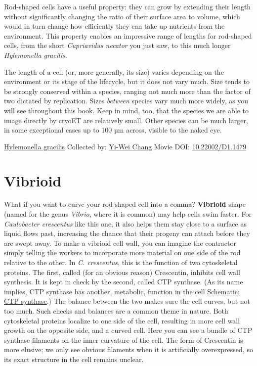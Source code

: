 \documentclass[]{tufte-book}
\begin{document}
Rod-shaped cells have a useful property: they can grow by extending their length without significantly changing the ratio of their surface area to volume, which would in turn change how efficiently they can take up nutrients from the environment. This property enables an impressive range of lengths for rod-shaped cells, from the short \emph{Cupriavidus necator} you just saw, to this much longer \emph{Hylemonella gracilis}.

The length of a cell (or, more generally, its size) varies depending on the environment or its stage of the lifecycle, but it does not vary much. Size tends to be strongly conserved within a species, ranging not much more than the factor of two dictated by replication. Sizes \emph{between} species vary much more widely, as you will see throughout this book. Keep in mind, too, that the species we are able to image directly by cryoET are relatively small. Other species can be much larger, in some exceptional cases up to 100 µm across, visible to the naked eye.



\hypertarget{htmlwidget-6fb2ea8c6df4aa12e02e}{}

\label{fig:3-3}\protect\hyperlink{tree}{Hylemonella gracilis} Collected by: \protect\hyperlink{yi-wei_chang}{Yi-Wei Chang} Movie DOI: \href{https://doi.org/10.22002/D1.1479}{10.22002/D1.1479}

\hypertarget{vibrioid}{%
\section{Vibrioid}\label{vibrioid}}

What if you want to curve your rod-shaped cell into a comma? \textbf{Vibrioid} shape (named for the genus \emph{Vibrio}, where it is common) may help cells swim faster. For \emph{Caulobacter crescentus} like this one, it also helps them stay close to a surface as liquid flows past, increasing the chance that their progeny can attach before they are swept away. To make a vibrioid cell wall, you can imagine the contractor simply telling the workers to incorporate more material on one side of the rod relative to the other. In \emph{C. crescentus}, this is the function of two cytoskeletal proteins. The first, called (for an obvious reason) Crescentin, inhibits cell wall synthesis. It is kept in check by the second, called CTP synthase. (As its name implies, CTP synthase has another, metabolic, function in the cell \protect\hyperlink{CTP_synthase}{Schematic: CTP synthase}.) The balance between the two makes sure the cell curves, but not too much. Such checks and balances are a common theme in nature. Both cytoskeletal proteins localize to one side of the cell, resulting in more cell wall growth on the opposite side, and a curved cell. Here you can see a bundle of CTP synthase filaments on the inner curvature of the cell. The form of Crescentin is more elusive; we only see obvious filaments when it is artificially overexpressed, so its exact structure in the cell remains unclear.
\end{document}
